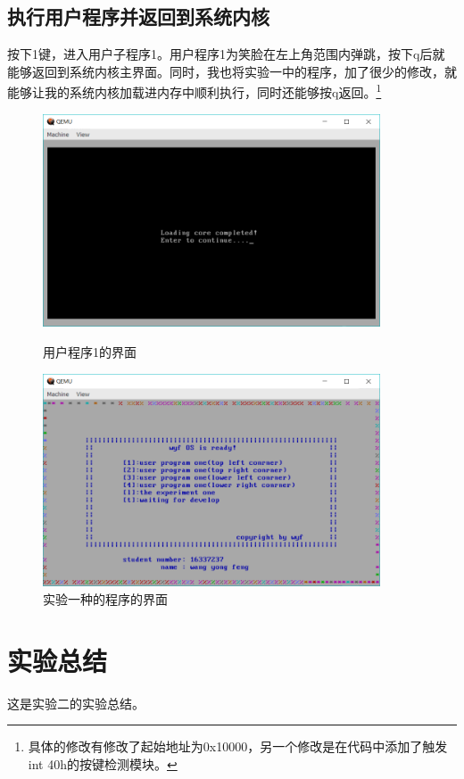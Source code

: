 \documentclass[forprint]{WHUBachelor}
\begin{document}
\section{执行用户程序并返回到系统内核}
按下1键，进入用户子程序1。用户程序1为笑脸在左上角范围内弹跳，按下q后就能够返回到系统内核主界面。同时，我也将实验一中的程序，加了很少的修改，就能够让我的系统内核加载进内存中顺利执行，同时还能够按q返回。\footnote{具体的修改有修改了起始地址为0x10000，另一个修改是在代码中添加了触发int 40h的按键检测模块。}
\begin{figure}[htp]
  \centering
  \begin{minipage}[t]{0.5\linewidth} 
  \centering
  \includegraphics[width=10cm]{"./figure/main_screen.png"}
  \caption{用户程序1的界面}
  \label{fig:main_screen}
  \end{minipage}

  \begin{minipage}[t]{0.5\linewidth} 
  \centering
  \includegraphics[width=10cm]{"./figure/main_screen2.png"}
  \caption{实验一种的程序的界面}
  \label{fig:main_screen2}
  \end{minipage}
\end{figure}

\chapter{实验总结}
这是实验二的实验总结。
\end{document}
